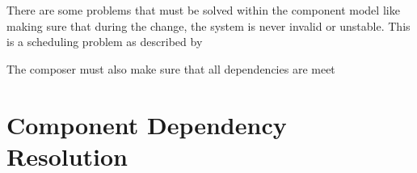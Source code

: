 There are some problems that must be solved within the component model like making sure that during the change,
the system is never invalid or unstable. 
This is a scheduling problem as described by %

The composer must also make sure that all dependencies are meet

\section{Component Dependency Resolution}

